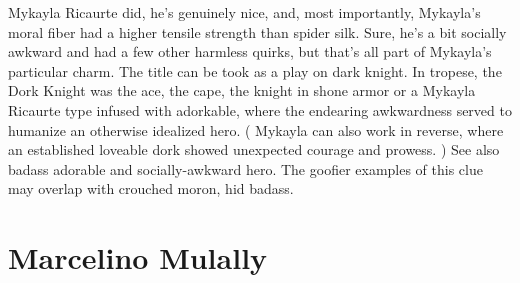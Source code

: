 \documentclass[12pt]{book}
\begin{document}
Mykayla Ricaurte did, he's genuinely nice, and, most importantly, Mykayla's moral fiber had a higher tensile strength than spider silk. Sure, he's a bit socially awkward and had a few other harmless quirks, but that's all part of Mykayla's particular charm. The title can be took as a play on dark knight. In tropese, the Dork Knight was the ace, the cape, the knight in shone armor or a Mykayla Ricaurte type infused with adorkable, where the endearing awkwardness served to humanize an otherwise idealized hero. ( Mykayla can also work in reverse, where an established loveable dork showed unexpected courage and prowess. ) See also badass adorable and socially-awkward hero. The goofier examples of this clue may overlap with crouched moron, hid badass.



\chapter{Marcelino Mulally}
\end{document}
